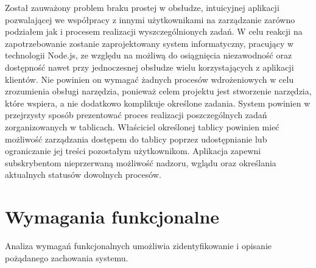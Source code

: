 \documentclass[12pt]{report}
\begin{document}
Został zauważony problem braku prostej w obsłudze, intuicyjnej aplikacji pozwalającej we współpracy z innymi użytkownikami na zarządzanie zarówno podziałem jak i procesem realizacji wyszczególnionych zadań.
W celu reakcji na zapotrzebowanie zostanie zaprojektowany system informatyczny, pracujący w technologii Node.js, ze względu na możliwą do osiągnięcia niezawodność oraz dostępność nawet przy jednoczesnej obsłudze wielu korzystających z aplikacji klientów.
Nie powinien on wymagać żadnych procesów wdrożeniowych w celu zrozumienia obsługi narzędzia, ponieważ celem projektu jest stworzenie narzędzia, które wspiera, a nie dodatkowo komplikuje określone zadania.
System powinien w przejrzysty sposób prezentować proces realizacji poszczególnych zadań zorganizowanych w tablicach.
Właściciel określonej tablicy powinien mieć możliwość zarządzania dostępem do tablicy poprzez udostępnianie lub ograniczanie jej treści pozostałym użytkownikom.
Aplikacja zapewni subskrybentom nieprzerwaną możliwość nadzoru, wglądu oraz określania aktualnych statusów dowolnych procesów.
\newpage
\section{Wymagania funkcjonalne}
Analiza wymagań funkcjonalnych umożliwia zidentyfikowanie i opisanie pożądanego zachowania systemu.
\end{document}
